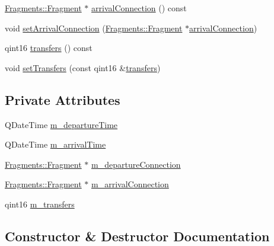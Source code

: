 \begin{DoxyCompactItemize}
\item 
\mbox{\hyperlink{classFragments_1_1Fragment}{Fragments\+::\+Fragment}} $\ast$ \mbox{\hyperlink{classCSA_1_1StationStopProfile_a6cfce145f35c2263a21a207844470bec}{arrival\+Connection}} () const
\item 
void \mbox{\hyperlink{classCSA_1_1StationStopProfile_aaf7ff4817f02d371363fd7d9cb3981cc}{set\+Arrival\+Connection}} (\mbox{\hyperlink{classFragments_1_1Fragment}{Fragments\+::\+Fragment}} $\ast$\mbox{\hyperlink{classCSA_1_1StationStopProfile_a6cfce145f35c2263a21a207844470bec}{arrival\+Connection}})
\item 
qint16 \mbox{\hyperlink{classCSA_1_1StationStopProfile_a10a03b9f10dec06eac01f970c77b3ada}{transfers}} () const
\item 
void \mbox{\hyperlink{classCSA_1_1StationStopProfile_a52596359c1750e648a907dffba3c6a42}{set\+Transfers}} (const qint16 \&\mbox{\hyperlink{classCSA_1_1StationStopProfile_a10a03b9f10dec06eac01f970c77b3ada}{transfers}})
\end{DoxyCompactItemize}
\subsection*{Private Attributes}
\begin{DoxyCompactItemize}
\item 
Q\+Date\+Time \mbox{\hyperlink{classCSA_1_1StationStopProfile_ade3eb19735433a7ab6956ac34d023e3b}{m\+\_\+departure\+Time}}
\item 
Q\+Date\+Time \mbox{\hyperlink{classCSA_1_1StationStopProfile_a652144ad18e1d039364301c909d316aa}{m\+\_\+arrival\+Time}}
\item 
\mbox{\hyperlink{classFragments_1_1Fragment}{Fragments\+::\+Fragment}} $\ast$ \mbox{\hyperlink{classCSA_1_1StationStopProfile_a999eea44e28580f8f6783e488c0d028b}{m\+\_\+departure\+Connection}}
\item 
\mbox{\hyperlink{classFragments_1_1Fragment}{Fragments\+::\+Fragment}} $\ast$ \mbox{\hyperlink{classCSA_1_1StationStopProfile_afc632c63a7644b64241af818cf6cf179}{m\+\_\+arrival\+Connection}}
\item 
qint16 \mbox{\hyperlink{classCSA_1_1StationStopProfile_a9616f115681c835b03975aab6bb3dfae}{m\+\_\+transfers}}
\end{DoxyCompactItemize}


\subsection{Constructor \& Destructor Documentation}
\mbox{\label{classCSA_1_1StationStopProfile_aaad218564513e0a629a4b1e596c24d7f}} 
